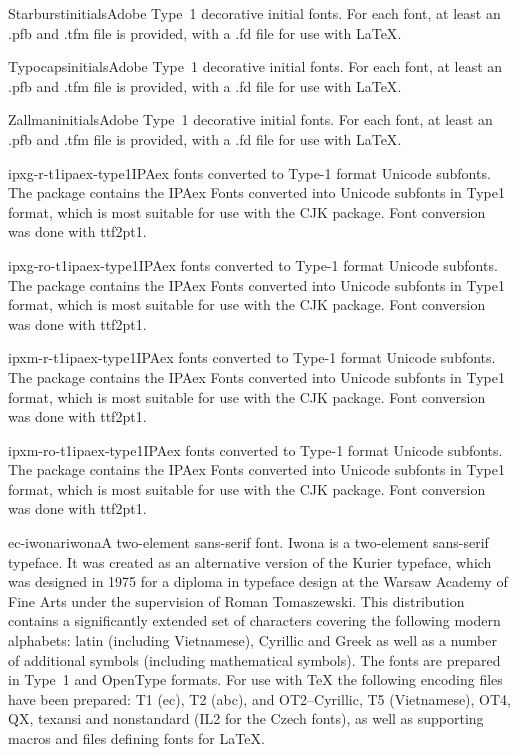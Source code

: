\documentclass{ddltxtyp}
\begin{document}
\begin{package}{Starburst}{initials}{Adobe Type~1 decorative initial fonts.}
For each font, at least an .pfb and .tfm file is provided, with
a .fd file for use with {\LaTeX}.
\end{package}
\begin{package}{Typocaps}{initials}{Adobe Type~1 decorative initial fonts.}
For each font, at least an .pfb and .tfm file is provided, with
a .fd file for use with {\LaTeX}.
\end{package}
\begin{package}{Zallman}{initials}{Adobe Type~1 decorative initial fonts.}
For each font, at least an .pfb and .tfm file is provided, with
a .fd file for use with {\LaTeX}.
\end{package}

\begin{package}{ipxg-r-t1}{ipaex-type1}{IPAex fonts converted to Type-1 format Unicode subfonts.}
The package contains the IPAex Fonts converted into Unicode
subfonts in Type1 format, which is most suitable for use with
the CJK package. Font conversion was done with ttf2pt1.
\end{package}
\begin{package}{ipxg-ro-t1}{ipaex-type1}{IPAex fonts converted to Type-1 format Unicode subfonts.}
The package contains the IPAex Fonts converted into Unicode
subfonts in Type1 format, which is most suitable for use with
the CJK package. Font conversion was done with ttf2pt1.
\end{package}
\begin{package}{ipxm-r-t1}{ipaex-type1}{IPAex fonts converted to Type-1 format Unicode subfonts.}
The package contains the IPAex Fonts converted into Unicode
subfonts in Type1 format, which is most suitable for use with
the CJK package. Font conversion was done with ttf2pt1.
\end{package}
\begin{package}{ipxm-ro-t1}{ipaex-type1}{IPAex fonts converted to Type-1 format Unicode subfonts.}
The package contains the IPAex Fonts converted into Unicode
subfonts in Type1 format, which is most suitable for use with
the CJK package. Font conversion was done with ttf2pt1.
\end{package}

\begin{package}{ec-iwonar}{iwona}{A two-element sans-serif font.}
Iwona is a two-element sans-serif typeface. It was created as
an alternative version of the Kurier typeface, which was
designed in 1975 for a diploma in typeface design at the Warsaw
Academy of Fine Arts under the supervision of Roman
Tomaszewski. This distribution contains a significantly
extended set of characters covering the following modern
alphabets: latin (including Vietnamese), Cyrillic and Greek as
well as a number of additional symbols (including mathematical
symbols). The fonts are prepared in Type~1 and OpenType
formats. For use with {\TeX} the following encoding files have
been prepared: T1 (ec), T2 (abc), and OT2--Cyrillic, T5
(Vietnamese), OT4, QX, texansi and nonstandard (IL2 for the
Czech fonts), as well as supporting macros and files defining
fonts for {\LaTeX}.
\end{package}
\end{document}
